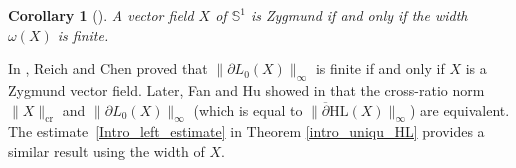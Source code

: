 \documentclass[JEP,XML,SOM,Unicode,NoEqCountersInSection, NoFloatCountersInSection,published]{cedram}
\theoremstyle{plain}
\newtheorem{cor}{Corollary}[section]
\theoremstyle{definition}
\begin{document}
\begin{cor}[{\cite[Th.\,1.3 \& Eq.\,(96)]{diaf2023Infearth}}]\label{Cor_diaf_inf}
A vector field $X$ of $\mathbb{S}^1$ is Zygmund if and only if the width $\omega(X)$ is finite.
\end{cor}

In \cite{Extension_with_bounded_derivative}, Reich and Chen proved that \(\lVert \partial L_0(X) \rVert_{\infty} \) is finite if and only if \(X \) is a Zygmund vector field. Later, Fan and Hu showed in \cite{FanJun} that the cross-ratio norm~\(\lVert X \rVert_\mathrm{cr} \) and \(\lVert \partial L_0(X) \rVert_{\infty} \) (which is equal to \(\lVert \overline{\partial} \mathrm{HL}(X) \rVert_{\infty} \)) are equivalent. The estimate~\eqref{Intro_left_estimate} in Theorem \ref{intro_uniqu_HL} provides a similar result using the width of \(X \).
\end{document}
